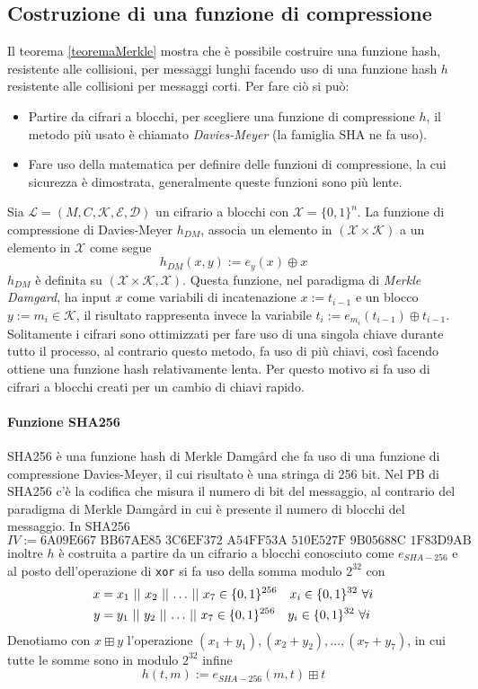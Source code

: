 \subsection{Costruzione di una funzione di compressione}
Il teorema \ref{teoremaMerkle} mostra che è possibile costruire una funzione hash, resistente alle collisioni, per messaggi lunghi facendo uso di una funzione hash $h$ resistente alle collisioni per messaggi corti. Per fare ciò si può:
\begin{itemize}
    \item Partire da cifrari a blocchi, per scegliere una funzione di compressione $h$, il metodo più usato è chiamato \emph{Davies-Meyer} (la famiglia SHA ne fa uso).
    \item Fare uso della matematica per definire delle funzioni di compressione, la cui sicurezza è dimostrata, generalmente queste funzioni sono più lente.
\end{itemize}

Sia $\mathcal{L} = (M,C,\mathcal{K},\mathcal{E},\mathcal{D})$ un cifrario a blocchi con $\mathcal{X} = \{0,1\}^{n}$. La funzione di compressione di Davies-Meyer $h_{DM}$, associa un elemento in $(\mathcal{X} \times \mathcal{K})$ a un elemento in $\mathcal{X}$ come segue
\[
    h_{DM}(x,y):= e_y(x) \oplus x
\]
$h_{DM}$ è definita su $(\mathcal{X}\times \mathcal{K},\mathcal{X})$. Questa funzione, nel paradigma di \emph{Merkle Damgard}, ha input $x$ come variabili di incatenazione $x:= t_{i-1}$ e un blocco $y:= m_i \in \mathcal{K}$, il risultato rappresenta invece la variabile $t_i := e_{m_i}(t_{i-1}) \oplus t_{i-1}$. Solitamente i cifrari sono ottimizzati per fare uso di una singola chiave durante tutto il processo, al contrario questo metodo, fa uso di più chiavi, così facendo ottiene una funzione hash relativamente lenta. Per questo motivo si fa uso di cifrari a blocchi creati per un cambio di chiavi rapido.

\paragraph{Funzione SHA256}
SHA256 è una funzione hash di Merkle Damgård che fa uso di una funzione di compressione Davies-Meyer, il cui risultato è una stringa di 256 bit. Nel PB di SHA256 c'è la codifica che misura il numero di bit del messaggio, al contrario del paradigma di Merkle Damgård in cui è presente il numero di blocchi del messaggio. In SHA256
\[
    IV := \text{6A09E667 BB67AE85 3C6EF372 A54FF53A 510E527F 9B05688C 1F83D9AB 5BE0CD19}
\]
inoltre $h$ è costruita a partire da un cifrario a blocchi conosciuto come $e_{SHA-256}$ e al posto dell'operazione di \texttt{xor} si fa uso della somma modulo $2^{32}$ con 
\begin{align*}
    x &= x_{1} \operatorname{\,||\,} x_{2} \operatorname{\,||\,} \dots \operatorname{\,||\,} x_7 \in \{0,1\}^{256} \quad x_i \in \{0,1\}^{32} \ \forall i\\
    y &= y_{1} \operatorname{\,||\,} y_{2} \operatorname{\,||\,} \dots \operatorname{\,||\,} x_7 \in \{0,1\}^{256} \quad y_i \in \{0,1\}^{32} \ \forall i
\end{align*}
Denotiamo con $x \boxplus y$ l'operazione $(x_1  + y_1), (x_2 + y_2), \dots, (x_7 + y_7)$, in cui tutte le somme sono in modulo $2^{32}$ infine 
\[
    h(t,m):= e_{SHA-256}(m,t) \boxplus t
\]

